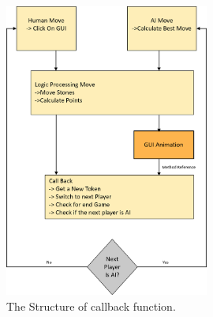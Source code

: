 \begin{figure}[h]
	\centering
	\includegraphics[width=0.6\textwidth]{image/StructureOfCallback}
	\caption{The Structure of callback function.}
	\label{fig:StructureOfCallback}
\end{figure}
